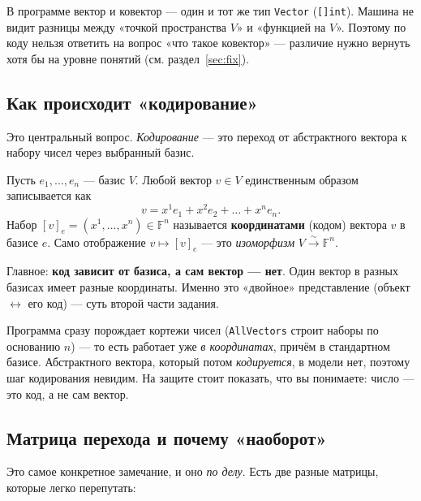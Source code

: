 \documentclass[11pt]{article}
\newcommand{\F}{\mathbb{F}}
\begin{document}
\begin{warnbox}
В программе вектор и ковектор — один и тот же тип \texttt{Vector} (\texttt{[]int}).
Машина не видит разницы между «точкой пространства $V$» и «функцией на $V$». Поэтому по
коду нельзя ответить на вопрос «что такое ковектор» — различие нужно вернуть хотя бы на
уровне понятий (см. раздел~\ref{sec:fix}).
\end{warnbox}

\subsection{Как происходит «кодирование»}

Это центральный вопрос. \emph{Кодирование} — это переход от абстрактного вектора к
набору чисел через выбранный базис.

\begin{idea}
Пусть $e_1,\dots,e_n$ — базис $V$. Любой вектор $v\in V$ единственным образом
записывается как
\[
  v = x^1 e_1 + x^2 e_2 + \dots + x^n e_n .
\]
Набор $[v]_e=(x^1,\dots,x^n)\in\F^{n}$ называется \textbf{координатами} (кодом) вектора
$v$ в базисе $e$. Само отображение $v\mapsto [v]_e$ — это \emph{изоморфизм}
$V \xrightarrow{\sim} \F^{n}$.
\end{idea}

Главное: \textbf{код зависит от базиса, а сам вектор — нет}. Один вектор в разных
базисах имеет разные координаты. Именно это «двойное» представление (объект $\leftrightarrow$
его код) — суть второй части задания.

\begin{warnbox}
Программа сразу порождает кортежи чисел (\texttt{AllVectors} строит наборы по основанию
$n$) — то есть работает уже \emph{в координатах}, причём в стандартном базисе.
Абстрактного вектора, который потом \emph{кодируется}, в модели нет, поэтому шаг
кодирования невидим. На защите стоит показать, что вы понимаете: число — это код, а не
сам вектор.
\end{warnbox}

\subsection{Матрица перехода и почему «наоборот»}
\label{ssec:transwarn}

Это самое конкретное замечание, и оно \emph{по делу}. Есть две разные матрицы, которые
легко перепутать:
\end{document}
